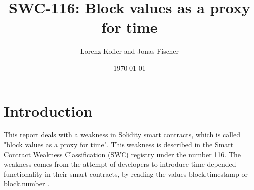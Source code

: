\documentclass{article}
\title{SWC-116: Block values as a proxy for time}
\author{Lorenz Kofler and Jonas Fischer}
\date{\today}
\begin{document}
\maketitle
\tableofcontents
\newpage

\section{Introduction}
This report deals with a weakness in Solidity smart contracts, which is called
"block values as a proxy for time". This weakness is described in the Smart
Contract Weakness Classification (SWC) registry under the number 116. \newline
The weakness comes from the attempt of developers to introduce time depended
functionality in their smart contracts, by reading the values block.timestamp
or block.number \cite{swc116}. \newline



% 








\end{document}
